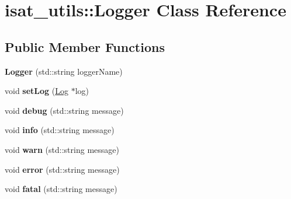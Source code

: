 \hypertarget{classisat__utils_1_1_logger}{}\section{isat\+\_\+utils\+:\+:Logger Class Reference}
\label{classisat__utils_1_1_logger}
\subsection*{Public Member Functions}
\begin{DoxyCompactItemize}
\item 
{\bfseries Logger} (std\+::string logger\+Name)\hypertarget{classisat__utils_1_1_logger_a018ab14cec09fb2e9d69f730d14774f0}{}\label{classisat__utils_1_1_logger_a018ab14cec09fb2e9d69f730d14774f0}

\item 
void {\bfseries set\+Log} (\hyperlink{classisat__utils_1_1_log}{Log} $\ast$log)\hypertarget{classisat__utils_1_1_logger_acef3f6dec4c9206822b58e1ef8b5a802}{}\label{classisat__utils_1_1_logger_acef3f6dec4c9206822b58e1ef8b5a802}

\item 
void {\bfseries debug} (std\+::string message)\hypertarget{classisat__utils_1_1_logger_a5f343e722f2605b2d3af8528b66aeaae}{}\label{classisat__utils_1_1_logger_a5f343e722f2605b2d3af8528b66aeaae}

\item 
void {\bfseries info} (std\+::string message)\hypertarget{classisat__utils_1_1_logger_a603df91c9bac656280dd683619bbed35}{}\label{classisat__utils_1_1_logger_a603df91c9bac656280dd683619bbed35}

\item 
void {\bfseries warn} (std\+::string message)\hypertarget{classisat__utils_1_1_logger_a61d385a824293f2d05ec2389ed2b601d}{}\label{classisat__utils_1_1_logger_a61d385a824293f2d05ec2389ed2b601d}

\item 
void {\bfseries error} (std\+::string message)\hypertarget{classisat__utils_1_1_logger_acddaa197cc0643b43dcd62d5cda82b89}{}\label{classisat__utils_1_1_logger_acddaa197cc0643b43dcd62d5cda82b89}

\item 
void {\bfseries fatal} (std\+::string message)\hypertarget{classisat__utils_1_1_logger_ac279424c66b6f2b1d4d753f34a926c80}{}\label{classisat__utils_1_1_logger_ac279424c66b6f2b1d4d753f34a926c80}

\end{DoxyCompactItemize}
